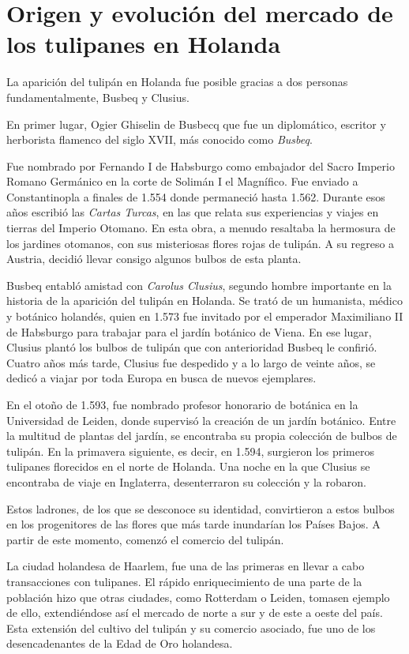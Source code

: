 \section{Origen y evolución del mercado de los tulipanes en Holanda}

La aparición del tulipán en Holanda fue posible gracias a dos personas fundamentalmente, Busbeq y Clusius.

En primer lugar, Ogier Ghiselin de Busbecq que fue un diplomático, escritor y herborista flamenco del siglo XVII, más conocido como \emph{Busbeq}.

Fue nombrado por Fernando I de Habsburgo como embajador del Sacro Imperio Romano Germánico en la corte de Solimán I el Magnífico. Fue enviado a Constantinopla a finales de 1.554 donde permaneció hasta 1.562. Durante esos años escribió las \emph{Cartas Turcas}, en las que relata sus experiencias y viajes en tierras del Imperio Otomano. En esta obra, a menudo resaltaba la hermosura de los jardines otomanos, con sus misteriosas flores rojas de tulipán. A su regreso a Austria, decidió llevar consigo algunos bulbos de esta planta. 

Busbeq entabló amistad con \emph{Carolus Clusius}, segundo hombre importante en la historia de la aparición del tulipán en Holanda. Se trató de un humanista, médico y botánico holandés, quien en 1.573 fue invitado por el emperador Maximiliano II de Habsburgo para trabajar para el jardín botánico de Viena. En ese lugar, Clusius plantó los bulbos de tulipán que con anterioridad Busbeq le confirió. Cuatro años más tarde, Clusius fue despedido y a lo largo de veinte años, se dedicó a viajar por toda Europa en busca de nuevos ejemplares.

En el otoño de 1.593, fue nombrado profesor honorario de botánica en la Universidad de Leiden, donde supervisó la creación de un jardín botánico. Entre la multitud de plantas del jardín, se encontraba su propia colección de bulbos de tulipán. En la primavera siguiente, es decir, en 1.594, surgieron los primeros tulipanes florecidos en el norte de Holanda. Una noche en la que Clusius se encontraba de viaje en Inglaterra, desenterraron su colección y la robaron.

Estos ladrones, de los que se desconoce su identidad, convirtieron a estos bulbos en los progenitores de las flores que más tarde inundarían los Países Bajos. A partir de este momento, comenzó el comercio del tulipán.

La ciudad holandesa de Haarlem, fue una de las primeras en llevar a cabo transacciones con tulipanes. El rápido enriquecimiento de una parte de la población hizo que otras ciudades, como Rotterdam o Leiden, tomasen ejemplo de ello, extendiéndose así el mercado de norte a sur y de este a oeste del país. Esta extensión del cultivo del tulipán y su comercio asociado, fue uno de los desencadenantes de la Edad de Oro holandesa.

